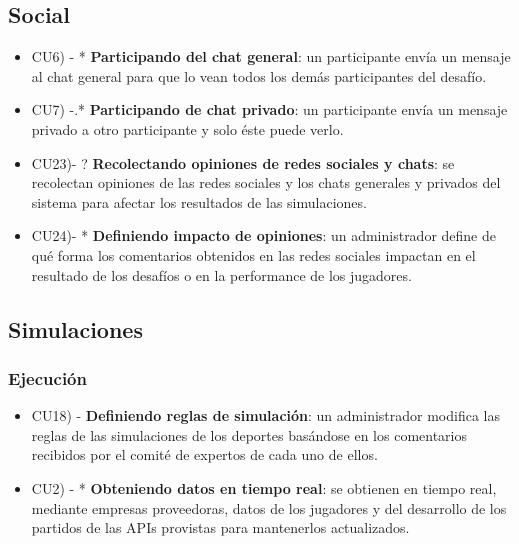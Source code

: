 \subsection{Social}
\begin{itemize}
\item CU6) - * \textbf{Participando del chat general}: un participante envía un mensaje al chat general para que lo vean todos los demás participantes del desafío.

\item CU7) -.* \textbf{Participando de chat privado}: un participante envía un mensaje privado a otro participante y solo éste puede verlo.

\item CU23)- ? \textbf{Recolectando opiniones de redes sociales y chats}: se recolectan opiniones de las redes sociales y los chats generales y privados del sistema para afectar los resultados de las simulaciones.

\item CU24)- * \textbf{Definiendo impacto de opiniones}: un administrador define de qué forma los comentarios obtenidos en las redes sociales impactan en el resultado de los desafíos o en la performance de los jugadores.
\end{itemize}

\subsection{Simulaciones}
\subsubsection{Ejecución}
\begin{itemize}
\item CU18) - \textbf{Definiendo reglas de simulación}: un administrador modifica las reglas de las simulaciones de los deportes basándose en los comentarios recibidos por el comité de expertos de cada uno de ellos.

\item CU2) - * \textbf{Obteniendo datos en tiempo real}: se obtienen en tiempo real, mediante empresas proveedoras, datos de los jugadores y del desarrollo de los partidos de las APIs provistas para mantenerlos actualizados. 

\end{itemize}


